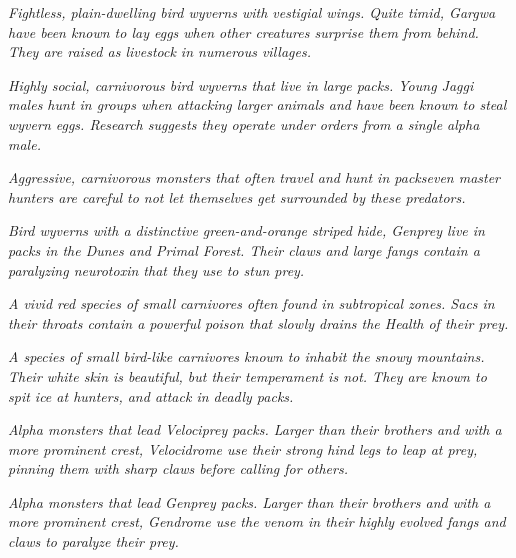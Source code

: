 \textit{Fightless, plain-dwelling bird wyverns with vestigial wings. Quite timid, Gargwa have been known to lay eggs when other creatures surprise them from behind. They are raised as livestock in numerous villages.}

\textit{Highly social, carnivorous bird wyverns that live in large packs. Young Jaggi males hunt in groups when attacking larger animals and have been known to steal wyvern eggs. Research suggests they operate under orders from a single alpha male.}

\textit{Aggressive, carnivorous monsters that often travel and hunt in packs\hbNone even master hunters are careful to not let themselves get surrounded by these predators.}

\textit{Bird wyverns with a distinctive green-and-orange striped hide, Genprey live in packs in the Dunes and Primal Forest. Their claws and large fangs contain a paralyzing neurotoxin that they use to stun prey.}

\textit{A vivid red species of small carnivores often found in subtropical zones. Sacs in their throats contain a powerful poison that slowly drains the Health of their prey.}

\textit{A species of small bird-like carnivores known to inhabit the snowy mountains. Their white skin is beautiful, but their temperament is not. They are known to spit ice at hunters, and attack in deadly packs.}

\textit{Alpha monsters that lead Velociprey packs. Larger than their brothers and with a more prominent crest, Velocidrome use their strong hind legs to leap at prey, pinning them with sharp claws before calling for others.}

\textit{Alpha monsters that lead Genprey packs. Larger than their brothers and with a more prominent crest, Gendrome use the venom in their highly evolved fangs and claws to paralyze their prey.}

